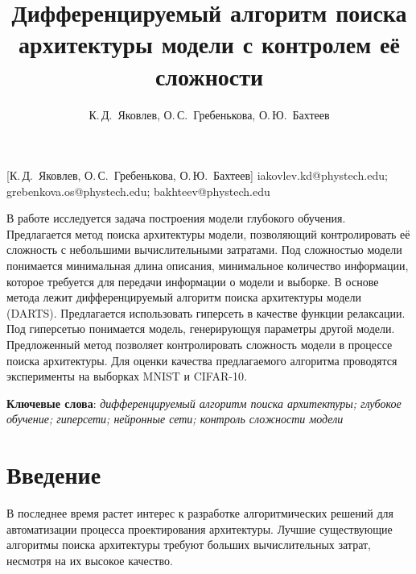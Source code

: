 \documentclass[12pt, twoside]{article}
\begin{document}
\title
    [Дифференцируемый алгоритм поиска архитектуры модели с контролем её сложности] %
    {Дифференцируемый алгоритм поиска архитектуры модели с контролем её сложности}
\author
    [К.\,Д.~Яковлев, О.\,С.~Гребенькова, О.\,Ю.~Бахтеев] %
    {К.\,Д.~Яковлев, О.\,С.~Гребенькова, О.\,Ю.~Бахтеев} %
    [К.\,Д.~Яковлев, О.\,С.~Гребенькова, О.\,Ю.~Бахтеев] %
\email
    { iakovlev.kd@phystech.edu; grebenkova.os@phystech.edu; bakhteev@phystech.edu}

\abstract
    {В работе исследуется задача построения модели глубокого обучения. Предлагается метод поиска архитектуры модели, позволяющий контролировать её сложность с небольшими вычислительными затратами. Под сложностью модели понимается минимальная длина описания,
минимальное количество информации, которое требуется для передачи информации о модели и выборке. В основе метода лежит дифференцируемый алгоритм поиска архитектуры модели (DARTS). Предлагается использовать гиперсеть в качестве функции релаксации.  Под гиперсетью понимается модель, генерирующуя параметры другой модели. Предложенный метод позволяет контролировать сложность модели в процессе поиска архитектуры. Для оценки качества предлагаемого алгоритма проводятся эксперименты на выборках MNIST и CIFAR-10.
	
\bigskip
\noindent
\textbf{Ключевые слова}: \emph {дифференцируемый алгоритм поиска архитектуры; глубокое обучение; гиперсети; нейронные сети; контроль сложности модели}
}





\maketitle
\linenumbers

\section{Введение}

В последнее время растет интерес к разработке алгоритмических решений для автоматизации процесса проектирования архитектуры. Лучшие существующие алгоритмы поиска архитектуры требуют больших вычислительных затрат, несмотря на их высокое качество.
\end{document}
